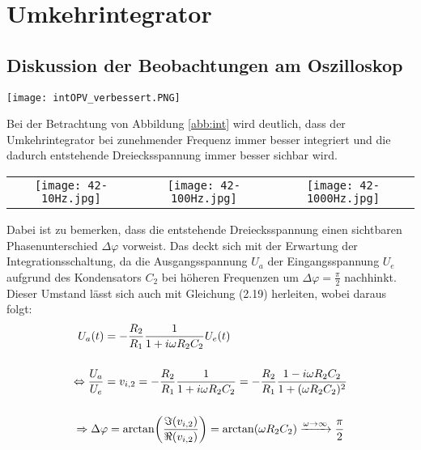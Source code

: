 

\def\weite{4cm}

\section{Umkehrintegrator}


\subsection*{Diskussion der Beobachtungen am Oszilloskop}
\begin{center}
    \texttt{[image: intOPV\_verbessert.PNG]}
\end{center}
Bei der Betrachtung von Abbildung \ref{abb:int} wird deutlich, dass der Umkehrintegrator bei zunehmender Frequenz immer besser integriert und die dadurch entstehende Dreiecksspannung immer besser sichbar wird.
\begin{center}
    \begin{tabular}{c c c}
        \texttt{[image: 42-10Hz.jpg]} & \texttt{[image: 42-100Hz.jpg]} & \texttt{[image: 42-1000Hz.jpg]}
    \end{tabular}
    \label{abb:int}
\end{center}
Dabei ist zu bemerken, dass die entstehende Dreiecksspannung einen sichtbaren Phasenunterschied $\Delta\varphi$ vorweist. Das deckt sich mit der Erwartung der Integrationsschaltung, da die Ausgangsspannung $U_a$ der Eingangsspannung $U_e$ aufgrund des Kondensators $C_2$ bei höheren Frequenzen um $\Delta\varphi = \frac{\pi}{2}$ nachhinkt. Dieser Umstand lässt sich auch mit Gleichung (2.19) herleiten, wobei daraus folgt:
\begin{gather}
    \begin{aligned}
        U_a(t) &= - \frac{R_2}{R_1} \frac{1}{1+i\omega R_2 C_2} U_e(t)\\[0.5cm]
        \Leftrightarrow \frac{U_a}{U_e} &= v_{i,2} = - \frac{R_2}{R_1} \frac{1}{1+i\omega R_2 C_2} = - \frac{R_2}{R_1} \frac{1 - i\omega R_2 C_2}{1+(\omega R_2 C_2)^2}
    \end{aligned}\\[0.5cm]
    \Rightarrow \Delta\varphi = \arctan(\frac{\imaginary(v_{i,2})}{\real(v_{i,2})}) = \arctan(\omega R_2 C_2) \xrightarrow{\omega \rightarrow \infty} \frac{\pi}{2} 
\end{gather}
